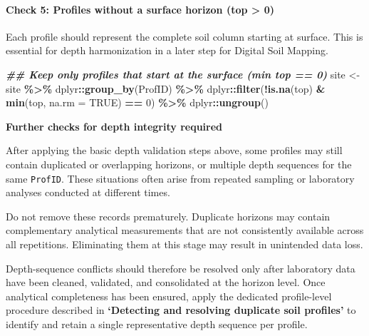 \documentclass[
  10pt,
  b5paper,
  oneside]{book}
\newenvironment{Shaded}{\begin{snugshade}}{\end{snugshade}}
\newcommand{\AttributeTok}[1]{\textcolor[rgb]{0.13,0.29,0.53}{#1}}
\newcommand{\ConstantTok}[1]{\textcolor[rgb]{0.56,0.35,0.01}{#1}}
\newcommand{\DecValTok}[1]{\textcolor[rgb]{0.00,0.00,0.81}{#1}}
\newcommand{\DocumentationTok}[1]{\textcolor[rgb]{0.56,0.35,0.01}{\textbf{\textit{#1}}}}
\newcommand{\FunctionTok}[1]{\textcolor[rgb]{0.13,0.29,0.53}{\textbf{#1}}}
\newcommand{\NormalTok}[1]{#1}
\newcommand{\OtherTok}[1]{\textcolor[rgb]{0.56,0.35,0.01}{#1}}
\newcommand{\SpecialCharTok}[1]{\textcolor[rgb]{0.81,0.36,0.00}{\textbf{#1}}}
\begin{document}
\paragraph*{Check 5: Profiles without a surface horizon (top \textgreater{} 0)}\label{check-5-profiles-without-a-surface-horizon-top-0}

Each profile should represent the complete soil column starting at surface. This is essential for depth harmonization in a later step for Digital Soil Mapping.

\begin{Shaded}
\begin{Highlighting}[]
\DocumentationTok{\#\# Keep only profiles that start at the surface (min top == 0)}
\NormalTok{site }\OtherTok{\textless{}{-}}\NormalTok{ site }\SpecialCharTok{\%\textgreater{}\%}
\NormalTok{  dplyr}\SpecialCharTok{::}\FunctionTok{group\_by}\NormalTok{(ProfID) }\SpecialCharTok{\%\textgreater{}\%}
\NormalTok{  dplyr}\SpecialCharTok{::}\FunctionTok{filter}\NormalTok{(}\SpecialCharTok{!}\FunctionTok{is.na}\NormalTok{(top) }\SpecialCharTok{\&} \FunctionTok{min}\NormalTok{(top, }\AttributeTok{na.rm =} \ConstantTok{TRUE}\NormalTok{) }\SpecialCharTok{==} \DecValTok{0}\NormalTok{) }\SpecialCharTok{\%\textgreater{}\%}
\NormalTok{  dplyr}\SpecialCharTok{::}\FunctionTok{ungroup}\NormalTok{()}
\end{Highlighting}
\end{Shaded}

\textbf{Further checks for depth integrity required}

After applying the basic depth validation steps above, some profiles may still contain duplicated or overlapping horizons, or multiple depth sequences for the same \texttt{ProfID}. These situations often arise from repeated sampling or laboratory analyses conducted at different times.

Do not remove these records prematurely. Duplicate horizons may contain complementary analytical measurements that are not consistently available across all repetitions. Eliminating them at this stage may result in unintended data loss.

Depth-sequence conflicts should therefore be resolved only after laboratory data have been cleaned, validated, and consolidated at the horizon level. Once analytical completeness has been ensured, apply the dedicated profile-level procedure described in \textbf{`Detecting and resolving duplicate soil profiles'} to identify and retain a single representative depth sequence per profile.
\end{document}

